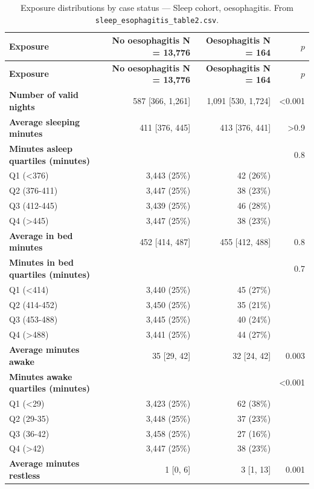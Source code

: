 \documentclass[11pt]{article}
\newcommand{\code}[1]{\texttt{\small #1}}
\begin{document}
\footnotesize\begin{longtable}{@{}p{6.4cm}rrr@{}}
\caption{Exposure distributions by case status --- Sleep cohort, oesophagitis. From \code{sleep\_esophagitis\_table2.csv}.}\label{tab:appM-t2-sleep-esophagitis}\\
\toprule \textbf{Exposure} & \textbf{No oesophagitis     N = 13,776} & \textbf{Oesophagitis     N = 164} & \textbf{$p$} \\ \midrule \endfirsthead
\toprule \textbf{Exposure} & \textbf{No oesophagitis     N = 13,776} & \textbf{Oesophagitis     N = 164} & \textbf{$p$} \\ \midrule \endhead
\textbf{Number of valid nights} & 587 [366, 1,261] & 1,091 [530, 1,724] & <0.001 \\
\textbf{Average sleeping minutes} & 411 [376, 445] & 413 [376, 441] & >0.9 \\
\textbf{Minutes asleep quartiles (minutes)} &  &  & 0.8 \\
\quad Q1 (<376) & 3,443 (25\%) & 42 (26\%) &  \\
\quad Q2 (376-411) & 3,447 (25\%) & 38 (23\%) &  \\
\quad Q3 (412-445) & 3,439 (25\%) & 46 (28\%) &  \\
\quad Q4 (>445) & 3,447 (25\%) & 38 (23\%) &  \\
\textbf{Average in bed minutes} & 452 [414, 487] & 455 [412, 488] & 0.8 \\
\textbf{Minutes in bed quartiles (minutes)} &  &  & 0.7 \\
\quad Q1 (<414) & 3,440 (25\%) & 45 (27\%) &  \\
\quad Q2 (414-452) & 3,450 (25\%) & 35 (21\%) &  \\
\quad Q3 (453-488) & 3,445 (25\%) & 40 (24\%) &  \\
\quad Q4 (>488) & 3,441 (25\%) & 44 (27\%) &  \\
\textbf{Average minutes awake} & 35 [29, 42] & 32 [24, 42] & 0.003 \\
\textbf{Minutes awake quartiles (minutes)} &  &  & <0.001 \\
\quad Q1 (<29) & 3,423 (25\%) & 62 (38\%) &  \\
\quad Q2 (29-35) & 3,448 (25\%) & 37 (23\%) &  \\
\quad Q3 (36-42) & 3,458 (25\%) & 27 (16\%) &  \\
\quad Q4 (>42) & 3,447 (25\%) & 38 (23\%) &  \\
\textbf{Average minutes restless} & 1 [0, 6] & 3 [1, 13] & 0.001 \\

\end{longtable}
\end{document}
